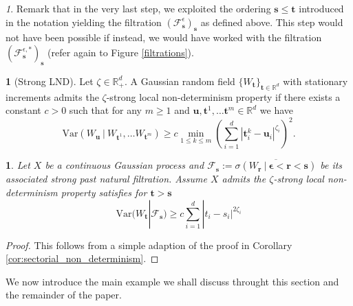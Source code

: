 \documentclass[11pt,oneside,english,reqno]{amsart}
\numberwithin{equation}{section}
\numberwithin{figure}{section}
\theoremstyle{plain}
\theoremstyle{definition}
\newtheorem{defn}[thm]{\protect\definitionname}
\theoremstyle{remark}
\newtheorem{rem}[thm]{\protect\remarkname}
\theoremstyle{plain}
\theoremstyle{plain}
\theoremstyle{plain}
\newtheorem{cor}[thm]{\protect\corollaryname}
\theoremstyle{plain}
\theoremstyle{plain}
\providecommand{\corollaryname}{Corollary}
\providecommand{\definitionname}{Definition}
\providecommand{\remarkname}{Remark}
\newcommand{\cF}{\mathcal{F}}
\newcommand{\cG}{\mathcal{G}}
\newcommand{\RR}{\mathbb{R}}
\newcommand{\br}{\mathbf{r}}
\newcommand{\bu}{\mathbf{u}}
\newcommand{\bs}{\mathbf{s}}
\newcommand{\bt}{\mathbf{t}}
\begin{document}


\begin{rem}
    Remark that in the very last step, we exploited the ordering $\bs\leq \bt$ introduced in the notation yielding the filtration $(\mathcal{F}^\epsilon_\bs)_\bs$ as defined above. This step would not have been possible if instead, we would have worked with the filtration $(\mathcal{F}^{\epsilon, *}_\bs)_\bs$ (refer again to Figure \ref{filtrations}).
\end{rem}
\begin{defn}[Strong LND] \cite[Section 2.4, (C3')]{Xiao} Let $\zeta\in \RR^d_+$. A Gaussian random field $\{W_\bt\}_{\bt\in \RR^d}$ with stationary increments admits the $\zeta$-strong local non-determinism property if there exists a constant $c>0$ such that for any $m\geq 1$ and $\bu, \bt^1, \dots \bt^m\in \RR^d$ we have
\begin{equation*}
    \mbox{Var}(W_\bu\ |\ W_{\bt^1}, \dots W_{\bt^m})\geq  c\min_{1\leq k\leq m}\left(\sum_{i=1}^d |\bt^k_i-\bu_i|^{\zeta_i}\right)^2. 
\end{equation*}
\end{defn}
 \begin{cor}
        Let $X$ be a continuous Gaussian process and $ \mathcal{F}_\bs:=\overline{\sigma(W_\br~\vert~ \boldsymbol\epsilon<\br<\bs)}$ be its associated strong past natural filtration. Assume $X$ admits the $\zeta$-strong local non-determinism property satisfies for $\bt>\bs$
        \begin{equation}
            \mbox{Var}(W_\bt| \mathcal{F}_\bs)\geq c\sum_{i=1}^d |t_i-s_i|^{2\zeta_i}
            \label{strong LND impli}
        \end{equation}
    \end{cor}
    \begin{proof}
        This follows from a simple adaption of the  proof in Corollary \ref{cor:sectorial_non_determinism}. 
    \end{proof}
We now introduce the main example we shall discuss throught this section and the remainder of the paper.
\end{document}
